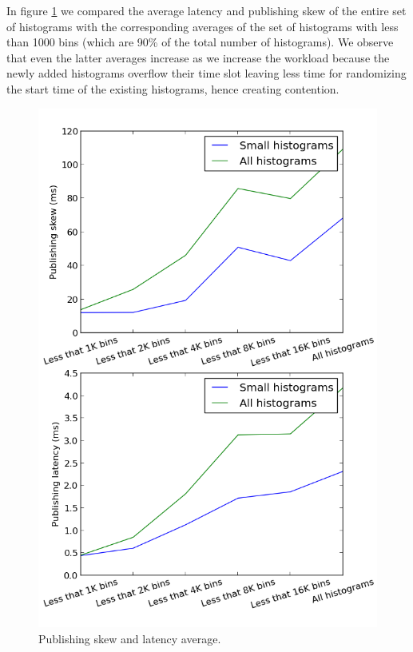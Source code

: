 In figure \ref{fig:small_vs_all} we compared the average latency and publishing skew of the entire set of histograms with the corresponding averages of the set of histograms with less than 1000 bins (which are 90\% of the total number of histograms). We observe that even the latter averages increase as we increase the workload because the newly added histograms overflow their time slot leaving less time for randomizing the start time of the existing histograms, hence creating contention. 

\begin{figure}[ht]
\centering
\includegraphics[scale=0.5]{Images/small_vs_all.png}
\caption{Publishing skew and latency average.}
\label{fig:small_vs_all}
\end{figure}






